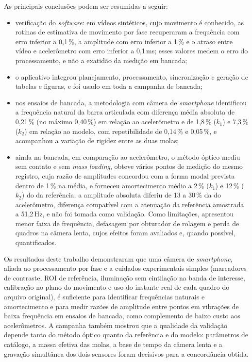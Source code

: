 \documentclass[a4paper,10pt,twocolumn]{article}
\begin{document}
As principais conclusões podem ser resumidas a seguir:
\begin{itemize}
    \item verificação do \textit{software}: em vídeos sintéticos, cujo movimento é conhecido, as rotinas de estimativa de movimento por fase recuperaram a frequência com erro inferior a 0,1\,\%, a amplitude com erro inferior a 1\,\% e o atraso entre vídeo e acelerômetro com erro inferior a 0,1\,ms; esses valores medem o erro do processamento, e não a exatidão da medição em bancada;
    \item o aplicativo integrou planejamento, processamento, sincronização e geração de tabelas e figuras, e foi usado em toda a campanha de bancada;
    \item nos ensaios de bancada, a metodologia com câmera de \textit{smartphone} identificou a frequência natural da barra articulada com diferença média absoluta de 0,21\,\% (no máximo 0,40\,\%) em relação ao acelerômetro e de 1,8\,\% ($k_1$) e 7,3\,\% ($k_2$) em relação ao modelo, com repetibilidade de 0,14\,\% e 0,05\,\%, e acompanhou a variação de rigidez entre as duas molas;
    \item ainda na bancada, em comparação ao acelerômetro, o método óptico mediu sem contato e sem \textit{mass loading}, obteve vários pontos de medição do mesmo registro, cuja razão de amplitudes concordou com a forma modal prevista dentro de 1\,\% na média, e forneceu amortecimento médio a 2\,\% ($k_1$) e 12\,\% ($k_2$) do da referência; a amplitude absoluta diferiu de 13 a 30\,\% da do acelerômetro, diferença compatível com a atenuação da referência amostrada a 51,2\,Hz, e não foi tomada como validação. Como limitações, apresentou menor faixa de frequência, defasagem por obturador de rolagem e perda de quadros na câmera lenta, cujos efeitos foram avaliados e, quando possível, quantificados.
\end{itemize}

Os resultados deste trabalho demonstraram que uma câmera de \textit{smartphone}, aliada ao processamento por fase e a cuidados experimentais simples (marcadores de contraste, ROI de referência, iluminação sem cintilação na banda de interesse, calibração no plano do movimento e uso do instante real de cada quadro do arquivo original), é suficiente para identificar frequências naturais e amortecimento e para medir razões de amplitude entre pontos em vibrações de baixa frequência em ensaios de bancada, como complemento de baixo custo aos acelerômetros. A campanha também mostrou que a qualidade da validação depende tanto do método óptico quanto da referência e do modelo: parâmetros de catálogo, a massa efetiva das molas, a base de tempo da câmera lenta e a gravação simultânea dos dois sensores foram decisivos para a concordância obtida.
\end{document}
